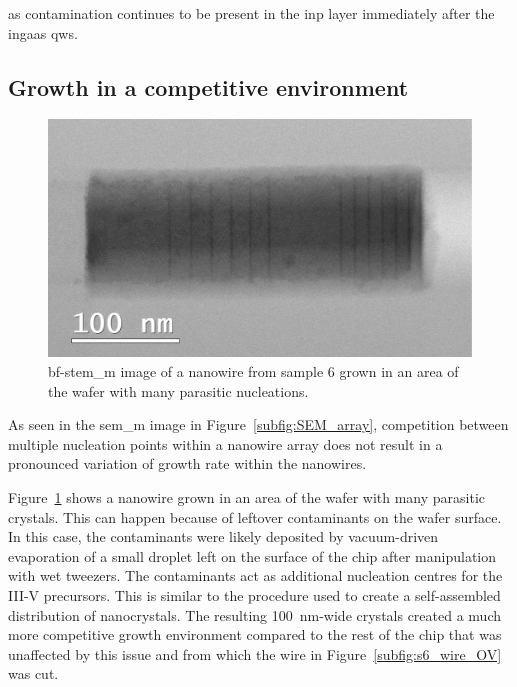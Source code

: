 \Acl{as} contamination continues to be present in the \acs{inp} layer immediately after the \acs{ingaas} \acl{qw}s.

\subsection{Growth in a competitive environment}
\label{sec:competitive}

\begin{figure}
    \centering
    \includegraphics[width=\textwidth]{4_Properties/Fig/s6_competitive_OV.pdf}
    \caption{\acs{bf}-\acs{stem_m} image of a nanowire from sample 6 grown in an area of the wafer with many parasitic nucleations.}
    \label{fig:s6_competitive_OV}
\end{figure}

As seen in the \acs{sem_m} image in Figure~\ref{subfig:SEM_array}, competition between multiple nucleation points within a nanowire array does not result in a pronounced variation of growth rate within the nanowires. 

Figure~\ref{fig:s6_competitive_OV} shows a nanowire grown in an area of the wafer with many parasitic crystals. This can happen because of leftover contaminants on the wafer surface. In this case, the contaminants were likely deposited by vacuum-driven evaporation of a small droplet left on the surface of the chip after manipulation with wet tweezers. The contaminants act as additional nucleation centres for the III-V precursors. This is similar to the procedure used to create a self-assembled distribution of nanocrystals. The resulting \qty{100}{\nano\metre}-wide crystals created a much more competitive growth environment compared to the rest of the chip that was unaffected by this issue and from which the wire in Figure~\ref{subfig:s6_wire_OV} was cut.


